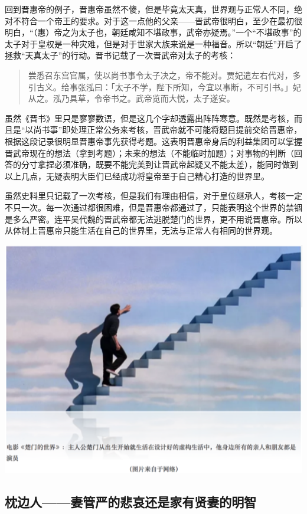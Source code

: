 \documentclass[]{book}
\begin{document}
回到晋惠帝的例子，晋惠帝虽然不傻，但是毕竟太天真，世界观与正常人不同，绝对不符合一个帝王的要求。对于这一点他的父亲------晋武帝很明白，至少在最初很明白，``（惠）帝之为太子也，朝廷咸知不堪政事，武帝亦疑焉。''一个``不堪政事''的太子对于皇权是一种灾难，但是对于世家大族来说是一种福音。所以``朝廷''开启了拯救``天真太子''的行动。晋书记载了一次晋武帝对太子的考核：

\begin{quote}
尝悉召东宫官属，使以尚书事令太子决之，帝不能对。贾妃遣左右代对，多引古义。给事张泓曰：「太子不学，陛下所知，今宜以事断，不可引书。」妃从之。泓乃具草，令帝书之。武帝览而大悦，太子遂安。
\end{quote}

虽然《晋书》里只是寥寥数语，但是这几个字却透露出阵阵寒意。既然是考核，而且是``以尚书事''即处理正常公务来考核，晋武帝就不可能将题目提前交给晋惠帝，根据这段记录很明显晋惠帝事先获得考题。这表明晋惠帝身后的利益集团可以掌握晋武帝现在的想法（拿到考题）；未来的想法（不能临时加题）；对事物的判断（回答的分寸拿捏必须准确，既要不能完美到让晋武帝起疑又不能太差），能同时做到以上几点，无疑表明大臣们已经成功将皇帝至于自己精心打造的世界里。

虽然史料里只记载了一次考核，但是我们有理由相信，对于皇位继承人，考核一定不只一次。每一次通过都很困难，但是晋惠帝都通过了，只能表明这个世界的禁锢是多么严密。连平吴代魏的晋武帝都无法逃脱楚门的世界，更不用说晋惠帝。所以从体制上晋惠帝只能生活在自己的世界里，无法与正常人有相同的世界观。

\includegraphics[width=6.67in]{images/his6}

\subsection{枕边人------妻管严的悲哀还是家有贤妻的明智}
\end{document}
